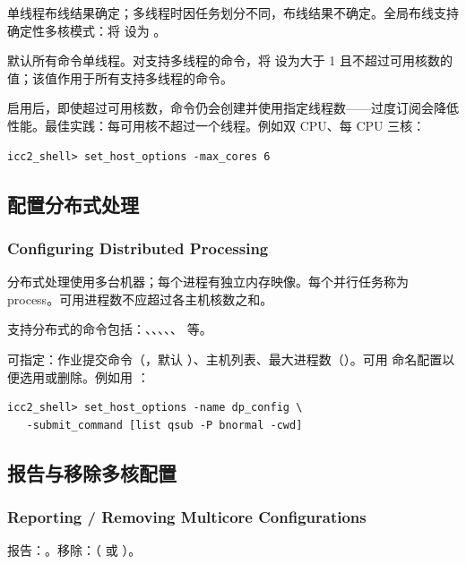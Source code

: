 \begin{noteBox}
单线程布线结果确定；多线程时因任务划分不同，布线结果不确定。全局布线支持确定性多核模式：将  设为 。
\end{noteBox}

默认所有命令单线程。对支持多线程的命令，将  设为大于 1 且不超过可用核数的值；该值作用于所有支持多线程的命令。

启用后，即使超过可用核数，命令仍会创建并使用指定线程数——过度订阅会降低性能。最佳实践：每可用核不超过一个线程。例如双 CPU、每 CPU 三核：
\begin{lstlisting}
icc2_shell> set_host_options -max_cores 6
\end{lstlisting}

\subsection{配置分布式处理}
\subsubsection*{Configuring Distributed Processing}

分布式处理使用多台机器；每个进程有独立内存映像。每个并行任务称为 process。可用进程数不应超过各主机核数之和。

支持分布式的命令包括：、、、、、 等。

可指定：作业提交命令（，默认 ）、主机列表、最大进程数（）。可用  命名配置以便选用或删除。例如用 ：
\begin{lstlisting}
icc2_shell> set_host_options -name dp_config \
   -submit_command [list qsub -P bnormal -cwd]
\end{lstlisting}

\subsection{报告与移除多核配置}
\subsubsection*{Reporting / Removing Multicore Configurations}

报告：。移除：（ 或 ）。


